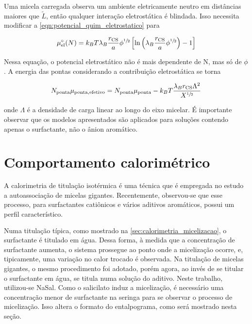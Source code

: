 		Uma micela carregada observa um ambiente eletricamente neutro em distâncias maiores que \(\tilde{L}\), então qualquer interação eletrostática é blindada. Isso necessita modificar a \autoref{eqn:potencial_quim_eletrostatico} para \cite{Giant_Micelles}
		
		\begin{equation}
			\mu_\mathrm{el}^\circ(N) = k_B T \lambda_B \dfrac{r_\mathrm{CS}}{a} \phi^{\sfrac{1}{2}} \left[ \ln \left( \lambda_B \dfrac{r_\mathrm{CS}}{a} \phi^{\sfrac{1}{2}} \right) - 1 \right]
			\label{eqn:potencial_eletrostatico_semidiluido}
		\end{equation}
		
		Nessa equação, o potencial eletrostático não é mais dependente de N, mas só de \(\phi\). A energia das pontas considerando a contribuição eletrostática se torna \cite{Giant_Micelles}
		
		\begin{equation}
			N_\mathrm{ponta}\mu_\mathrm{ponta, efetivo} = N_\mathrm{ponta}\mu_\mathrm{ponta} - k_B T \dfrac{\lambda_B r_\mathrm{CS} \Lambda^2}{X^{\sfrac{1}{2}}}
		\end{equation} 
		
		\noindent onde \(\Lambda\) é a densidade de carga linear ao longo do eixo micelar. É importante observar que os modelos apresentados são aplicados para soluções contendo apenas o surfactante, não o ânion aromático.
		

		\section{Comportamento calorimétrico} 
		
		A calorimetria de titulação isotérmica é uma técnica que é empregada no estudo a autoassociação de micelas gigantes.\cite{Sarac2009, Sarac2013, Liu2011a, Bijma1998c, Fisicaro2005a} Recentemente, observou-se que esse processo, para surfactantes catiônicos e vários aditivos aromáticos, possui um perfil característico.\cite{Ito2016, Ito2015c}

		Numa titulação típica, como mostrado na \autoref{sec:calorimetria_micelizacao}, o surfactante é titulado em água. Dessa forma, à medida que a concentração de surfactante aumenta, o sistema prossegue ao ponto onde a micelização ocorre, e, tipicamente, uma variação no calor trocado é observada. Na titulação de micelas gigantes, o mesmo procedimento foi adotado, porém agora, ao invés de se titular o surfactante em água, se titula numa solução do aditivo. Neste trabalho, utilizou-se NaSal. Como o salicilato induz a micelização, é necessário uma concentração menor de surfactante na seringa para se observar o processo de micelização. Isso altera o formato do entalpograma, como será mostrado nesta seção.
		
